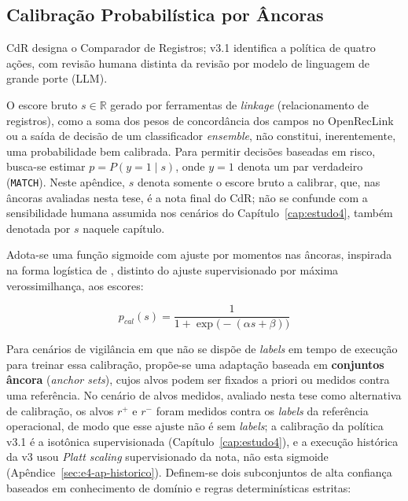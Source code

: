 \subsection{Calibração Probabilística por Âncoras}

CdR designa o Comparador de Registros; v3.1 identifica a política de quatro ações, com revisão humana distinta da revisão por modelo de linguagem de grande porte (LLM).

O escore bruto $s \in \mathbb{R}$ gerado por ferramentas de \textit{linkage} (relacionamento de registros), como a soma dos pesos de concordância dos campos no OpenRecLink ou a saída de decisão de um classificador \textit{ensemble}, não constitui, inerentemente, uma probabilidade bem calibrada. Para permitir decisões baseadas em risco, busca-se estimar $p = P(y=1\mid s)$, onde $y=1$ denota um par verdadeiro (\texttt{MATCH}). Neste apêndice, $s$ denota somente o escore bruto a calibrar, que, nas âncoras avaliadas nesta tese, é a nota final do CdR; não se confunde com a sensibilidade humana assumida nos cenários do Capítulo~\ref{cap:estudo4}, também denotada por $s$ naquele capítulo.

Adota-se uma função sigmoide com ajuste por momentos nas âncoras, inspirada na forma logística de , distinto do ajuste supervisionado por máxima verossimilhança, aos escores:

\[
p_{cal}(s) = \frac{1}{1 + \exp\bigl(-(\alpha s + \beta)\bigr)}
\]

Para cenários de vigilância em que não se dispõe de \textit{labels} em tempo de execução para treinar essa calibração, propõe-se uma adaptação baseada em \textbf{conjuntos âncora} (\textit{anchor sets}), cujos alvos podem ser fixados a priori ou medidos contra uma referência. No cenário de alvos medidos, avaliado nesta tese como alternativa de calibração, os alvos $r^+$ e $r^-$ foram medidos contra os \textit{labels} da referência operacional, de modo que esse ajuste não é sem \textit{labels}; a calibração da política v3.1 é a isotônica supervisionada (Capítulo~\ref{cap:estudo4}), e a execução histórica da v3 usou \textit{Platt scaling} supervisionado da nota, não esta sigmoide (Apêndice~\ref{sec:e4-ap-historico}). Definem-se dois subconjuntos de alta confiança baseados em conhecimento de domínio e regras determinísticas estritas:

